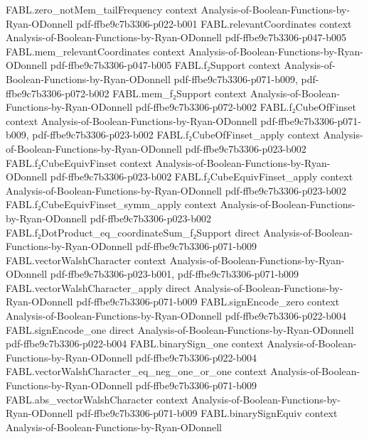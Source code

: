 \begin{theorem}
\proofstep
  {FABL.zero_notMem_tailFrequency}
  {context}
  {Analysis-of-Boolean-Functions-by-Ryan-ODonnell}
  {pdf-ffbe9c7b3306-p022-b001}
\proofstep
  {FABL.relevantCoordinates}
  {context}
  {Analysis-of-Boolean-Functions-by-Ryan-ODonnell}
  {pdf-ffbe9c7b3306-p047-b005}
\proofstep
  {FABL.mem_relevantCoordinates}
  {context}
  {Analysis-of-Boolean-Functions-by-Ryan-ODonnell}
  {pdf-ffbe9c7b3306-p047-b005}
\proofstep
  {FABL.f₂Support}
  {context}
  {Analysis-of-Boolean-Functions-by-Ryan-ODonnell}
  {pdf-ffbe9c7b3306-p071-b009,
    pdf-ffbe9c7b3306-p072-b002}
\proofstep
  {FABL.mem_f₂Support}
  {context}
  {Analysis-of-Boolean-Functions-by-Ryan-ODonnell}
  {pdf-ffbe9c7b3306-p072-b002}
\proofstep
  {FABL.f₂CubeOfFinset}
  {context}
  {Analysis-of-Boolean-Functions-by-Ryan-ODonnell}
  {pdf-ffbe9c7b3306-p071-b009,
    pdf-ffbe9c7b3306-p023-b002}
\proofstep
  {FABL.f₂CubeOfFinset_apply}
  {context}
  {Analysis-of-Boolean-Functions-by-Ryan-ODonnell}
  {pdf-ffbe9c7b3306-p023-b002}
\proofstep
  {FABL.f₂CubeEquivFinset}
  {context}
  {Analysis-of-Boolean-Functions-by-Ryan-ODonnell}
  {pdf-ffbe9c7b3306-p023-b002}
\proofstep
  {FABL.f₂CubeEquivFinset_apply}
  {context}
  {Analysis-of-Boolean-Functions-by-Ryan-ODonnell}
  {pdf-ffbe9c7b3306-p023-b002}
\proofstep
  {FABL.f₂CubeEquivFinset_symm_apply}
  {context}
  {Analysis-of-Boolean-Functions-by-Ryan-ODonnell}
  {pdf-ffbe9c7b3306-p023-b002}
\proofstep
  {FABL.f₂DotProduct_eq_coordinateSum_f₂Support}
  {direct}
  {Analysis-of-Boolean-Functions-by-Ryan-ODonnell}
  {pdf-ffbe9c7b3306-p071-b009}
\proofstep
  {FABL.vectorWalshCharacter}
  {context}
  {Analysis-of-Boolean-Functions-by-Ryan-ODonnell}
  {pdf-ffbe9c7b3306-p023-b001,
    pdf-ffbe9c7b3306-p071-b009}
\proofstep
  {FABL.vectorWalshCharacter_apply}
  {direct}
  {Analysis-of-Boolean-Functions-by-Ryan-ODonnell}
  {pdf-ffbe9c7b3306-p071-b009}
\proofstep
  {FABL.signEncode_zero}
  {context}
  {Analysis-of-Boolean-Functions-by-Ryan-ODonnell}
  {pdf-ffbe9c7b3306-p022-b004}
\proofstep
  {FABL.signEncode_one}
  {direct}
  {Analysis-of-Boolean-Functions-by-Ryan-ODonnell}
  {pdf-ffbe9c7b3306-p022-b004}
\proofstep
  {FABL.binarySign_one}
  {context}
  {Analysis-of-Boolean-Functions-by-Ryan-ODonnell}
  {pdf-ffbe9c7b3306-p022-b004}
\proofstep
  {FABL.vectorWalshCharacter_eq_neg_one_or_one}
  {context}
  {Analysis-of-Boolean-Functions-by-Ryan-ODonnell}
  {pdf-ffbe9c7b3306-p071-b009}
\proofstep
  {FABL.abs_vectorWalshCharacter}
  {context}
  {Analysis-of-Boolean-Functions-by-Ryan-ODonnell}
  {pdf-ffbe9c7b3306-p071-b009}
\proofstep
  {FABL.binarySignEquiv}
  {context}
  {Analysis-of-Boolean-Functions-by-Ryan-ODonnell}

\end{theorem}
